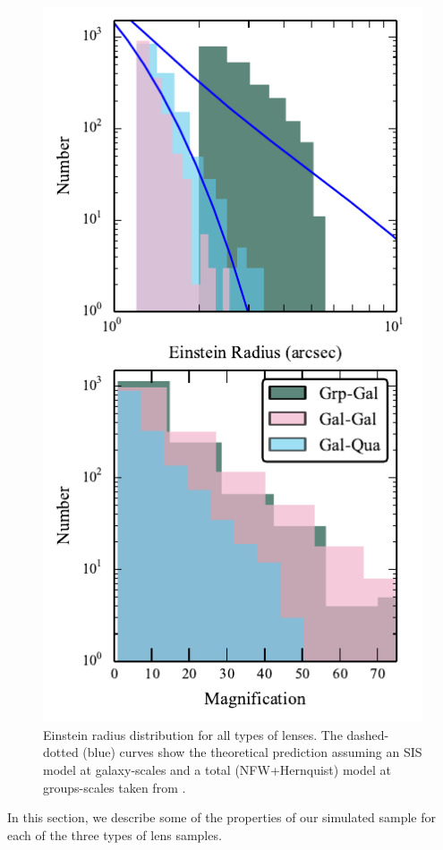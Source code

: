 \documentclass[useAMS,usenatbib,a4paper]{mn2e}
\begin{document}
\begin{figure}
\begin{center}
\includegraphics[scale=1.0]{sw-cfhtls-figs/distrib_remu.pdf}
\caption{ \label{fig:remudist}
Einstein radius distribution for all types of lenses. The dashed-dotted (blue)
curves show the theoretical prediction assuming an SIS model at galaxy-scales
and a total (NFW+Hernquist) model at groups-scales taken from \citep{More2012}.
}
\end{center}
\end{figure}

In this section, we describe some of the properties of our simulated sample for
each of the three types of lens samples.
\end{document}
